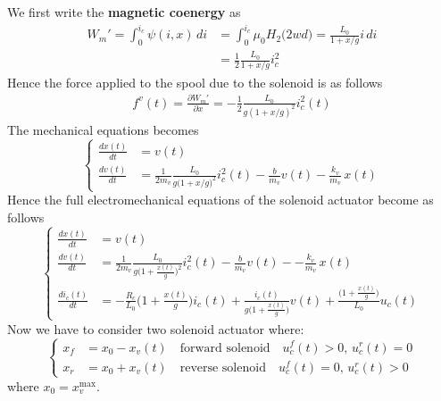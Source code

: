 \documentclass[12pt,a4paper,oneside]{book}
\begin{document}
\begin{onehalfspace}
We first write the \textbf{magnetic coenergy} as
\begin{equation}\label{solenoid_mech_eq_1}
	\begin{split}
		W_m'=\int_{0}^{i_c}\psi(i,x)\,di &= \int_{0}^{i_c}\mu_0H_2\Big(2wd\Big)=\frac{L_0}{1+x/g}i\,di\\[6pt]
		&=\frac{1}{2}\frac{L_0}{1+x/g}i_c^2
	\end{split}
\end{equation}
Hence the force applied to the spool due to the solenoid is as follows
\begin{equation}\label{solenoid_mech_eq_2}
	\begin{split}
		f^v(t)=\frac{\partial W_m'}{\partial x} = -\frac{1}{2}\frac{L_0}{g(1+x/g)^2}i_c^2(t)
	\end{split} 
\end{equation}
The mechanical equations becomes
\begin{equation}\label{solenoid_mech_eq_3}
	\left\lbrace \begin{aligned}
		\frac{dx(t)}{dt} &= v(t) \\[6pt]
		\frac{dv(t)}{dt} &= \frac{1}{2m_v}\frac{L_0}{g\Big(1+x/g\Big)^2}i_c^2(t)-\frac{b}{m_v} v(t)-\frac{k_v}{m_v}\,x(t)
	\end{aligned}\right. 
\end{equation}
Hence the full electromechanical equations of the solenoid actuator become as follows
\begin{equation}\label{solenoid_mech_eq_4}
	\left\lbrace \begin{aligned}
		\frac{dx(t)}{dt} &= v(t) \\[6pt]
		\frac{dv(t)}{dt} &= \frac{1}{2m_v}\frac{L_0}{g\Big(1+\frac{x(t)}{g}\Big)^2}i_c^2(t)-\frac{b}{m_v} v(t) - -\frac{k_v}{m_v}\,x(t)\\[6pt]
		\frac{di_c(t)}{dt} &=-\frac{R_c}{L_0}\Big(1+\frac{x(t)}{g}\Big)i_c(t)+\frac{i_c(t)}{g\Big(1+\frac{x(t)}{g}\Big)}v(t) +\frac{\Big(1+\frac{x(t)}{g}\Big)}{L_0}u_c(t)
	\end{aligned}\right. 
\end{equation}
Now we have to consider two solenoid actuator where:
\begin{equation*}\label{}
	\left\lbrace \begin{aligned}
		x_f &= x_0 - x_v(t) \quad\text{forward solenoid} \quad u_c^f(t)>0,\,u_c^r(t)=0\\[6pt]
		x_r &= x_0 + x_v(t) \quad\text{reverse solenoid} \quad u_c^f(t)=0,\,u_c^r(t)>0
	\end{aligned}\right. 
\end{equation*}
where $x_0=x_v^{\text{max}}$.


\end{onehalfspace}
\end{document}
